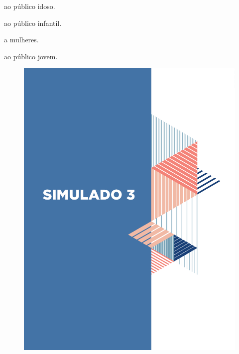 \begin{escolha}

    \item ao público idoso.

    \item ao público infantil.

    \item a mulheres.

    \item ao público jovem.

\end{escolha}



\begin{figure}
\vspace*{-3cm}
\hspace*{-3.7cm}\includegraphics[scale=1]{../watermarks/3simulado9ano.pdf}
\end{figure}


\pagebreak

